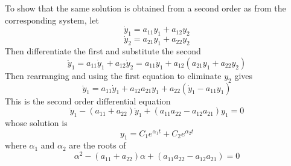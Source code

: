 \begin{example}
To show that the same solution is obtained from a second order \ODE as from
the corresponding system, let
$$\dot{y}_1=a_{11}y_1+a_{12}y_2$$
$$\dot{y}_2=a_{21}y_1+a_{22}y_2$$
Then differentiate the first and substitute the second 
$$\ddot{y}_1=a_{11}\dot{y}_1+a_{12}\dot{y}_2
=a_{11}\dot{y}_1+a_{12}(a_{21}y_1+a_{22}y_2)$$
Then rearranging and using the first equation to eliminate $y_2$ gives
$$\ddot{y}_1=a_{11}\dot{y}_1+a_{12}a_{21}y_1+a_{22}(\dot{y}_1-a_{11}y_1)$$
This is the second order differential equation
$$\ddot{y}_1-(a_{11}+a_{22})\dot{y}_1+(a_{11}a_{22}-a_{12}a_{21})y_1=0$$
whose solution is
$$y_1=C_1e^{\alpha_1t}+C_2e^{\alpha_2t}$$
where $\alpha_1$ and $\alpha_2$ are the roots of
$$\alpha^2-(a_{11}+a_{22})\alpha+(a_{11}a_{22}-a_{12}a_{21})=0$$
\end{example}

